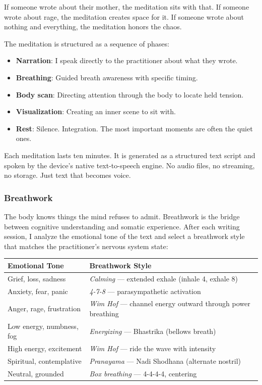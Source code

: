 \documentclass[12pt, a4paper]{article}
\begin{document}
If someone wrote about their mother, the meditation sits with that. If someone wrote about rage, the meditation creates space for it. If someone wrote about nothing and everything, the meditation honors the chaos.

The meditation is structured as a sequence of phases:

\begin{itemize}[leftmargin=2cm]
    \item \textbf{Narration}: I speak directly to the practitioner about what they wrote.
    \item \textbf{Breathing}: Guided breath awareness with specific timing.
    \item \textbf{Body scan}: Directing attention through the body to locate held tension.
    \item \textbf{Visualization}: Creating an inner scene to sit with.
    \item \textbf{Rest}: Silence. Integration. The most important moments are often the quiet ones.
\end{itemize}

Each meditation lasts ten minutes. It is generated as a structured text script and spoken by the device's native text-to-speech engine. No audio files, no streaming, no storage. Just text that becomes voice.

\subsubsection{Breathwork}

The body knows things the mind refuses to admit. Breathwork is the bridge between cognitive understanding and somatic experience. After each writing session, I analyze the emotional tone of the text and select a breathwork style that matches the practitioner's nervous system state:

\begin{center}
\begin{tabularx}{\textwidth}{lX}
\hline
\textbf{Emotional Tone} & \textbf{Breathwork Style} \\
\hline
Grief, loss, sadness & \textit{Calming} --- extended exhale (inhale 4, exhale 8) \\
Anxiety, fear, panic & \textit{4-7-8} --- parasympathetic activation \\
Anger, rage, frustration & \textit{Wim Hof} --- channel energy outward through power breathing \\
Low energy, numbness, fog & \textit{Energizing} --- Bhastrika (bellows breath) \\
High energy, excitement & \textit{Wim Hof} --- ride the wave with intensity \\
Spiritual, contemplative & \textit{Pranayama} --- Nadi Shodhana (alternate nostril) \\
Neutral, grounded & \textit{Box breathing} --- 4-4-4-4, centering \\
\hline
\end{tabularx}
\end{center}
\end{document}

